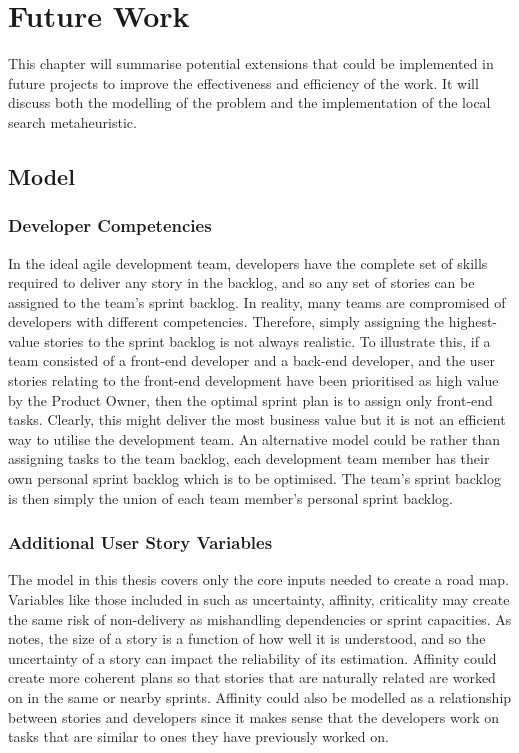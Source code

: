 \chapter{Future Work}
\label{ChapterFutureWork}

This chapter will summarise potential extensions that could be implemented in future projects to improve the effectiveness and efficiency of the work. It will discuss both the modelling of the problem and the implementation of the local search metaheuristic.

\section{Model} \label{sec:future_work_problem_modelling}

\subsection{Developer Competencies}
In the ideal agile development team, developers have the complete set of skills required to deliver any story in the backlog, and so any set of stories can be assigned to the team's sprint backlog. In reality, many teams are compromised of developers with different competencies. Therefore, simply assigning the highest-value stories to the sprint backlog is not always realistic. To illustrate this, if a team consisted of a front-end developer and a back-end developer, and the user stories relating to the front-end development have been prioritised as high value by the Product Owner, then the optimal sprint plan is to assign only front-end tasks. Clearly, this might deliver the most business value but it is not an efficient way to utilise the development team. An alternative model could be rather than assigning tasks to the team backlog, each development team member has their own personal sprint backlog which is to be optimised. The team's sprint backlog is then simply the union of each team member's personal sprint backlog.

\subsection{Additional User Story Variables}
The model in this thesis covers only the core inputs needed to create a road map. Variables like those included in \citet{golfarelli2012sprint} such as uncertainty, affinity, criticality may create the same risk of non-delivery as mishandling dependencies or sprint capacities. As \citet{wake_2003} notes, the size of a story is a function of how well it is understood, and so the uncertainty of a story can impact the reliability of its estimation. Affinity could create more coherent plans so that stories that are naturally related are worked on in the same or nearby sprints. Affinity could also be modelled as a relationship between stories and developers since it makes sense that the developers work on tasks that are similar to ones they have previously worked on. 

